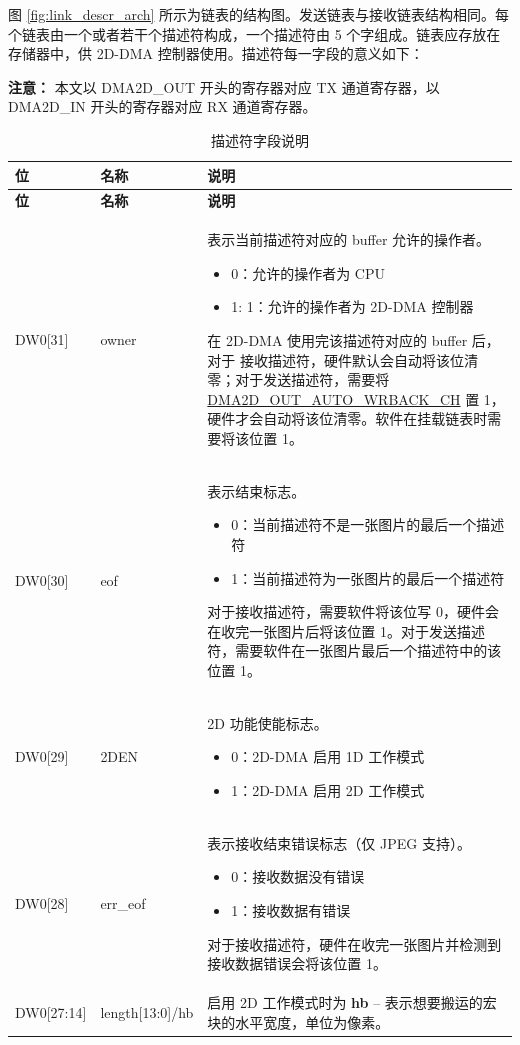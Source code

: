 \documentclass[main\_\_CN.tex]{subfiles}
\begin{document}
图 \ref{fig:link_descr_arch} 所示为链表的结构图。发送链表与接收链表结构相同。每个链表由一个或者若干个描述符构成，一个描述符由 5 个字组成。链表应存放在存储器中，供 2D-DMA 控制器使用。描述符每一字段的意义如下：

{\bfseries 注意： } 本文以 DMA2D\_OUT 开头的寄存器对应 TX 通道寄存器，以 DMA2D\_IN 开头的寄存器对应 RX 通道寄存器。

\begin{longtable}[c]{|m{1.8cm}|m{2.5cm}|L{10.2cm}|}
\caption{描述符字段说明} \label{tab:2ddma-dw}\\\hline
{}
\textbf{位} & \textbf{名称} & \textbf{说明} \\\hline
\endfirsthead
\hline
{}
\textbf{位} & \textbf{名称} & \textbf{说明} \\\hline
\endhead
\endfoot

DW0[31] & owner & 表示当前描述符对应的 buffer 允许的操作者。
    \begin{itemize}
        \item 0：允许的操作者为 CPU
        \item 1: 1：允许的操作者为 2D-DMA 控制器
    \end{itemize}
    在 2D-DMA 使用完该描述符对应的 buffer 后，对于 接收描述符，硬件默认会自动将该位清零；对于发送描述符，需要将 \hyperref[fielddesc:DMA2DOUTAUTOWRBACKCHN]{DMA2D\_OUT\_AUTO\_WRBACK\_CH} 置 1，硬件才会自动将该位清零。软件在挂载链表时需要将该位置 1。\\\hline
DW0[30] & eof & 表示结束标志。
    \begin{itemize}
        \item 0：当前描述符不是一张图片的最后一个描述符
        \item 1：当前描述符为一张图片的最后一个描述符
    \end{itemize}
    对于接收描述符，需要软件将该位写 0，硬件会在收完一张图片后将该位置 1。对于发送描述符，需要软件在一张图片最后一个描述符中的该位置 1。\\\hline
DW0[29] & 2DEN & 2D 功能使能标志。
    \begin{itemize}
        \item 0：2D-DMA 启用 1D 工作模式
        \item 1：2D-DMA 启用 2D 工作模式
        \vspace{-1.5em}
    \end{itemize}
    \\\hline
DW0[28] & err\_eof & 表示接收结束错误标志（仅 JPEG 支持）。
    \begin{itemize}
        \item 0：接收数据没有错误
        \item 1：接收数据有错误
    \end{itemize}
    对于接收描述符，硬件在收完一张图片并检测到接收数据错误会将该位置 1。 \\\hline
DW0[27:14] & length[13:0]/hb &  启用 2D 工作模式时为 \textbf{hb}  -- 表示想要搬运的宏块的水平宽度，单位为像素。


\end{longtable}
\end{document}
